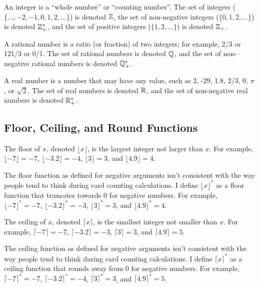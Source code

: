 An integer is a ``whole number'' or ``counting number''.  
The set of integers ($\{ \ldots, -2, -1, 0, 1, 2, \ldots\}$) is denoted ${\mathbb{Z}}{}$,
the set of non-negative integers ($\{ 0, 1, 2, \ldots\}$) is denoted ${\mathbb{Z}^*_+}{}$,
and the set of positive integers ($\{ 1, 2, \ldots\}$) is denoted ${\mathbb{Z}_+}{}$.

A rational number is a ratio (or fraction) of two integers; for example, 2/3 or 121/3 or 0/1.
The set of rational numbers is denoted ${\mathbb{Q}}{}$, and the set of non-negative rational numbers
is denoted ${\mathbb{Q}^*_+}$.

A real number is a number that may have any value, such as 2, -29, 1.8, 2/3, 0, $\pi$, or $\sqrt{2}$.
The set of real numbers is denoted ${\mathbb{R}}$, and the set of non-negative real numbers
is denoted ${\mathbb{R}^*_+}$.


\subsection{Floor, Ceiling, and Round Functions}
\label{cmct0:smtp0:sfcr0}

The floor of $x$, denoted $\lfloor x \rfloor$, is the largest integer not larger
than $x$.
For example, $\lfloor -7 \rfloor = -7$,
$\lfloor -3.2 \rfloor = -4$,
$\lfloor 3 \rfloor = 3$, and
$\lfloor 4.9 \rfloor = 4$.

The floor function as defined for negative arguments isn't consistent with the
way people tend to think during card counting calculations.  I define
$\lfloor x \rfloor^*$ as a floor function that truncates towards 0 for negative 
numbers.
For example, $\lfloor -7 \rfloor^* = -7$,
$\lfloor -3.2 \rfloor^* = -3$,
$\lfloor 3 \rfloor^* = 3$, and
$\lfloor 4.9 \rfloor^* = 4$.

The ceiling of $x$, denoted $\lceil x \rceil$, is the smallest integer not smaller
than $x$.
For example, $\lceil -7 \rceil = -7$,
$\lceil -3.2 \rceil = -3$,
$\lceil 3 \rceil = 3$, and
$\lceil 4.9 \rceil = 5$.

The ceiling function as defined for negative arguments isn't consistent with the
way people tend to think during card counting calculations.  I define
$\lceil x \rceil^*$ as a ceiling function that rounds away from 0 for negative 
numbers.
For example, $\lceil -7 \rceil^* = -7$,
$\lceil -3.2 \rceil^* = -4$,
$\lceil 3 \rceil^* = 3$, and
$\lceil 4.9 \rceil^* = 5$.

